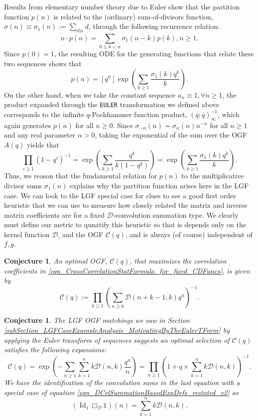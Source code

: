 \documentclass[12pt,reqno,a4letter]{article}
\numberwithin{figure}{section}
\numberwithin{table}{section}
\numberwithin{equation}{section}
\theoremstyle{plain}
\newtheorem{conjecture}[theorem]{Conjecture}
\numberwithin{theorem}{section}
\theoremstyle{definition}
\begin{document}
Results from elementary number theory due to Euler show that the partition function $p(n)$ is 
related to the (ordinary) sum-of-divisors function, $\sigma(n) \equiv \sigma_1(n) := \sum_{d|n} d$, 
through the following recurrence relation:
\[
n \cdot p(n) = \sum_{0 \leq k < n} \sigma_1(n-k) p(k), n \geq 1. 
\]
Since $p(0) = 1$, the resulting ODE for the generating functions that relate these two sequences 
shows that 
$$p(n) = [q^n] \exp\left(\sum_{k \geq 1} \frac{\sigma_1(k) q^k}{k}\right).$$
On the other hand, when we take the constant sequence $a_n \equiv 1, \forall n \geq 1$, the 
product expanded through the \texttt{EULER} transformation we defined above 
corresponds to the infinite $q$-Pochhammer function product, $(q; q)_{\infty}^{-1}$, which again 
generates $p(n)$ for all $n \geq 0$. 
Since $\sigma_{-\alpha}(n) = \sigma_{\alpha}(n) n^{-\alpha}$ for all $n \geq 1$ and any 
real parameter $\alpha > 0$, taking the exponential of the sum over the OGF $A(q)$ 
yields that 
\[
\prod_{i \geq 1} (1-q^i)^{-1} = \exp\left(\sum_{k \geq 1} \frac{q^k}{k(1-q^k)}\right) = 
     \exp\left(\sum_{k \geq 1} \frac{\sigma_1(k) q^k}{k}\right). 
\]
Thus, we reason that the fundamental relation for $p(n)$ to the multiplicative divisor sums 
$\sigma_1(n)$ explains why the partition function arises here in the LGF case. 
We can look to the LGF special case for clues to see a good first order heuristic that we can use 
to measure how closely related the matrix and inverse matrix coefficients are for a fixed 
$\mathcal{D}$-convolution summation type. We clearly must define our metric to qunatify this heuristic 
so that is depends only on the kernel function $\mathcal{D}$, and the OGF $\mathcal{C}(q)$, 
and is always (of course) independent of $f,g$. 

\begin{conjecture}
An optimal OGF, $\mathcal{C}(q)$, that maximizes the correlation coefficients in 
\eqref{eqn_CrossCorrelationStatFormula_for_fixed_CDFuncs}, is given by 
\[
\mathcal{C}(q) := \prod_{k \geq 1} \left(\sum_{n \geq 0} \mathcal{D}(n+k-1, k) q^n\right)^{-1}. 
\]
\end{conjecture}

\begin{conjecture}
The LGF OGF matchings we saw in 
Section \ref{subSection_LGFCaseExampleAnalysis_MotivatingByTheEulerTForm} by 
applying the Euler transform of sequences suggests an optimal selection of 
$\mathcal{C}(q)$ satisfies the following expansions: 
\[
\mathcal{C}(q) = \exp\left(-\sum_{n \geq 1} \sum_{k=1}^{n} k \mathcal{D}(n,k) \frac{q^n}{n}\right) = 
     \prod_{n \geq 1} \left(1 + q \times \sum_{k=1}^{n} k \mathcal{D}(n, k)\right)^{-1}.
\]
We have the identification of the convolution sums in the last equation with 
a special case of equation \eqref{eqn_DCvlSummationBasedExpDefs_restated_v2} as 
\[
\left(\operatorname{Id}_1 \boxdot_{\mathcal{D}} \mathds{1}\right)(n) = \sum_{k=1}^{n} k \mathcal{D}(n, k). 
\]
\end{conjecture}
\end{document}
